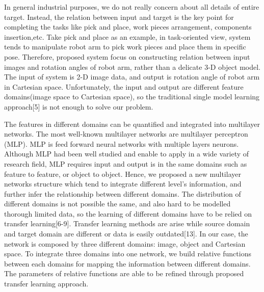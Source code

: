\documentclass[journal]{IEEEtran}
\begin{document}
In general industrial purposes, we do not really concern about all details of entire target. Instead, the relation between input and target is the key point for completing the tasks like pick and place, work pieces arrangement, components insertion,etc. Take pick and place as an example, in task-oriented view, system tends to manipulate robot arm to pick work pieces and place them in specific pose. Therefore, proposed system focus on constructing relation between input images and rotation angles of robot arm, rather than a delicate 3-D object model. The input of system is 2-D image data, and output is rotation angle of robot arm in Cartesian space. Unfortunately, the input and output are different feature domains(image space to Cartesian space), so the traditional single model learning approach[5] is not enough to solve our problem.

The features in different domains can be quantified and integrated into multilayer networks.  The most well-known multilayer networks are multilayer perceptron (MLP). MLP is feed forward neural networks with multiple layers neurons. Although MLP had been well studied and enable to apply in a wide variety of research field, MLP requires input and output is in the same domains such as feature to feature, or object to object. Hence, we proposed a new multilayer networks structure which tend to integrate different level’s information, and further infer the relationship between different domains. The distribution of different domains is not possible the same, and also hard to be modelled thorough limited data, so the learning of different domains have to be relied on transfer learning[6-9]. Transfer learning methods are arise while source domain and target domain are different or data is easily outdated[13]. In our case, the network is composed by three different domains: image, object and Cartesian space. To integrate three domains into one network, we build relative functions between each domains for mapping the information between different domains. The parameters of relative functions are able to be refined through proposed transfer learning approach. 
 
\end{document}
